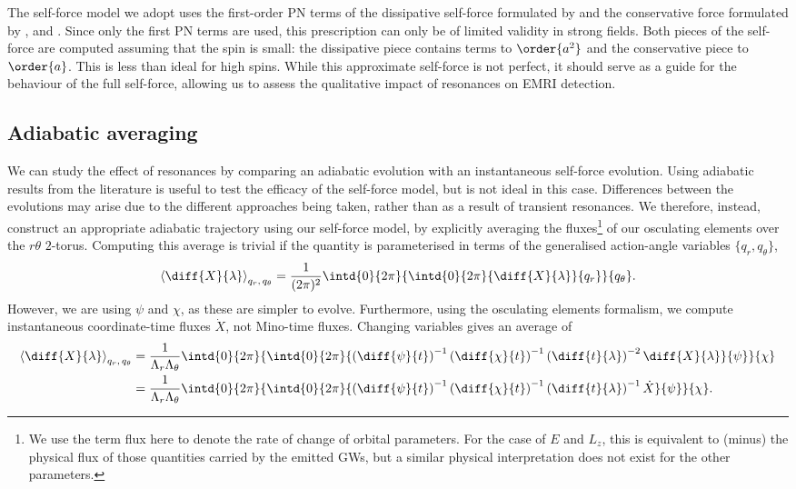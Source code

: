 The self-force model we adopt uses the first-order PN terms of the dissipative self-force formulated by \citet{flanagan_evolution_2007} and the conservative force formulated by \citet{iyer_post-newtonian_1993}, and \citet{kidder_coalescing_1995}. Since only the first PN terms are used, this prescription can only be of limited validity in strong fields. Both pieces of the self-force are computed assuming that the spin is small: the dissipative piece contains terms to $\order{a^2}$ and the conservative piece to $\order{a}$. This is less than ideal for high spins. While this approximate self-force is not perfect, it should serve as a guide for the behaviour of the full self-force, allowing us to assess the qualitative impact of resonances on EMRI detection.

\subsection{Adiabatic averaging}
\label{sec:res-ad-averaging}
We can study the effect of resonances by comparing an adiabatic evolution with an instantaneous self-force evolution. Using adiabatic results from the literature is useful to test the efficacy of the self-force model, but is not ideal in this case. Differences between the evolutions may arise due to the different approaches being taken, rather than as a result of transient resonances. We therefore, instead, construct an appropriate adiabatic trajectory using our self-force model, by explicitly averaging the fluxes\footnote{We use the term flux here to denote the rate of change of orbital parameters. For the case of $E$ and $L_z$, this is equivalent to (minus) the physical flux of those quantities carried by the emitted GWs, but a similar physical interpretation does not exist for the other parameters.} of our osculating elements over the $r\theta$ $2$-torus. Computing this average is trivial  if the quantity is parameterised in terms of the generalised action-angle variables $\{q_r, q_\theta\}$,
\begin{equation}
\left\langle \diff{X}{\lambda}\right\rangle_{q_r,\,q_\theta} = \frac{1}{(2\pi)^2}\intd{0}{2\pi}{\intd{0}{2\pi}{\diff{X}{\lambda}}{q_r}}{q_\theta}.
\end{equation}
However, we are using $\psi$ and $\chi$, as these are simpler to evolve. Furthermore, using the osculating elements formalism, we compute instantaneous coordinate-time fluxes $\dot{X}$, not Mino-time fluxes. Changing variables gives an average of \citep{drasco_computing_2005}
\begin{align}
\left\langle \diff{X}{\lambda}\right\rangle_{q_r,\,q_\theta} = {} & \frac{1}{\Lambda_r \Lambda_\theta}\intd{0}{2\pi}{\intd{0}{2\pi}{\left(\diff{\psi}{t}\right)^{-1} \left(\diff{\chi}{t}\right)^{-1} \left(\diff{t}{\lambda}\right)^{-2} \diff{X}{\lambda}}{\psi}}{\chi} \nonumber\\
 = {} & \frac{1}{\Lambda_r \Lambda_\theta}\intd{0}{2\pi}{\intd{0}{2\pi}{\left(\diff{\psi}{t}\right)^{-1} \left(\diff{\chi}{t}\right)^{-1} \left(\diff{t}{\lambda}\right)^{-1} \dot{X}}{\psi}}{\chi}.
\label{eq:2torus-average}
\end{align}
